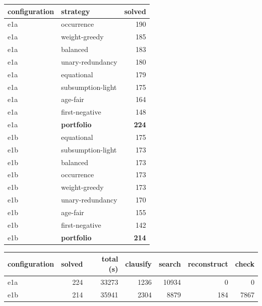 \begin{tabular}{llr}\toprule
configuration & strategy & solved \\\midrule
e1a & occurrence & 190 \\
e1a & weight-greedy & 185 \\
e1a & balanced & 183 \\
e1a & unary-redundancy & 180 \\
e1a & equational & 179 \\
e1a & subsumption-light & 175 \\
e1a & age-fair & 164 \\
e1a & first-negative & 148 \\
e1a & \textbf{portfolio} & \textbf{224} \\
e1b & equational & 175 \\
e1b & subsumption-light & 173 \\
e1b & balanced & 173 \\
e1b & occurrence & 173 \\
e1b & weight-greedy & 173 \\
e1b & unary-redundancy & 170 \\
e1b & age-fair & 155 \\
e1b & first-negative & 142 \\
e1b & \textbf{portfolio} & \textbf{214} \\
\bottomrule\end{tabular}

\begin{tabular}{lrrrrrr}\toprule
configuration & solved & total (s) & clausify & search & reconstruct & check \\\midrule
e1a & 224 & 33273 & 1236 & 10934 & 0 & 0 \\
e1b & 214 & 35941 & 2304 & 8879 & 184 & 7867 \\
\bottomrule\end{tabular}

